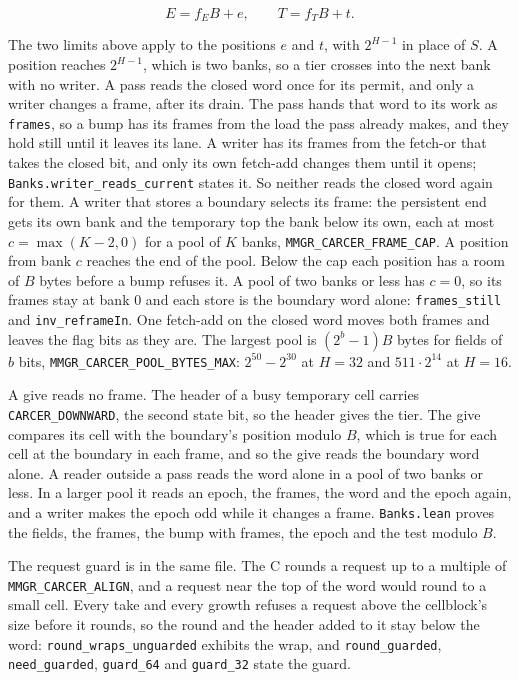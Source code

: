 \[
E = f_E B + e, \qquad T = f_T B + t .
\]

The two limits above apply to the positions \(e\) and \(t\), with \(2^{H-1}\) in place of \(S\). A position reaches \(2^{H-1}\), which is two banks, so a tier crosses into the next bank with no writer. A pass reads the closed word once for its permit, and only a writer changes a frame, after its drain. The pass hands that word to its work as \texttt{frames}, so a bump has its frames from the load the pass already makes, and they hold still until it leaves its lane. A writer has its frames from the fetch-or that takes the closed bit, and only its own fetch-add changes them until it opens; \texttt{Banks.\allowbreak{}writer\_\allowbreak{}reads\_\allowbreak{}current} states it. So neither reads the closed word again for them. A writer that stores a boundary selects its frame: the persistent end gets its own bank and the temporary top the bank below its own, each at most \(c = \max(K - 2, 0)\) for a pool of \(K\) banks, \texttt{MMGR\_\allowbreak{}CARCER\_\allowbreak{}FRAME\_\allowbreak{}CAP}. A position from bank \(c\) reaches the end of the pool. Below the cap each position has a room of \(B\) bytes before a bump refuses it. A pool of two banks or less has \(c = 0\), so its frames stay at bank 0 and each store is the boundary word alone: \texttt{frames\_\allowbreak{}still} and \texttt{inv\_\allowbreak{}reframe\allowbreak{}In}. One fetch-add on the closed word moves both frames and leaves the flag bits as they are. The largest pool is \((2^b - 1) B\) bytes for fields of \(b\) bits, \texttt{MMGR\_\allowbreak{}CARCER\_\allowbreak{}POOL\_\allowbreak{}BYTES\_\allowbreak{}MAX}: \(2^{50} - 2^{30}\) at \(H = 32\) and \(511 \cdot 2^{14}\) at \(H = 16\).

A give reads no frame. The header of a busy temporary cell carries \texttt{CARCER\_\allowbreak{}DOWNWARD}, the second state bit, so the header gives the tier. The give compares its cell with the boundary's position modulo \(B\), which is true for each cell at the boundary in each frame, and so the give reads the boundary word alone. A reader outside a pass reads the word alone in a pool of two banks or less. In a larger pool it reads an epoch, the frames, the word and the epoch again, and a writer makes the epoch odd while it changes a frame. \texttt{Banks.\allowbreak{}lean} proves the fields, the frames, the bump with frames, the epoch and the test modulo \(B\).

The request guard is in the same file. The C rounds a request up to a multiple of \texttt{MMGR\_\allowbreak{}CARCER\_\allowbreak{}ALIGN}, and a request near the top of the word would round to a small cell. Every take and every growth refuses a request above the cellblock's size before it rounds, so the round and the header added to it stay below the word: \texttt{round\_\allowbreak{}wraps\_\allowbreak{}unguarded} exhibits the wrap, and \texttt{round\_\allowbreak{}guarded}, \texttt{need\_\allowbreak{}guarded}, \texttt{guard\_\allowbreak{}64} and \texttt{guard\_\allowbreak{}32} state the guard.

